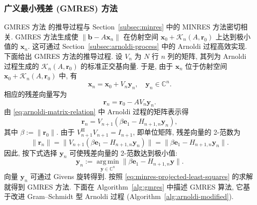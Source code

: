 \subsubsection{{广义最小残差 (GMRES) 方法}}\label{subsec:gmres-method}
{GMRES 方法  的推导过程与 Section\ \ref{subsec:minres} 中的 MINRES 方法密切相关. GMRES 方法生成使 $\|\bm b-A\bm x_n\|$ 在仿射空间 $\bm x_0+\mathcal K_n(A,\bm r_0)$ 上达到极小值的 $\bm x_n$. 这可通过 Section\ \ref{subsec:arnoldi-process} 中的 Arnoldi 过程高效实现. 下面给出 GMRES 方法的推导过程.}
{设 $V_n$ 为 $N$ 行 $n$ 列的矩阵, 其列为 Arnoldi 过程生成的 $\mathcal K_n(A,\bm r_0)$ 的标准正交基向量. 于是, 由于 $\bm x_n$ 位于仿射空间 $\bm x_0+\mathcal K_n(A,\bm r_0)$ 中, 有}
\[\bm x_n=\bm x_0+V_n\bm y_n,\quad\bm y_n\in\mathbb C^n.\]
{相应的残差向量写为}
\[\bm r_n=\bm r_0-AV_n\bm y_n.\]
{由 \eqref{eq:arnoldi-matrix-relation} 中 Arnoldi 过程的矩阵表示得}
\begin{equation}\label{eq:gmres-projected-residual}\bm r_n=V_{n+1}(\beta\bm e_1-H_{n+1,n}\bm y_n),\end{equation}
{其中 $\beta:=\|\bm r_0\|$. 由于 $V_{n+1}^{\mathrm H}V_{n+1}=I_{n+1}$, 即单位矩阵, 残差向量的 2-范数为}
\[\|\bm r_n\|=\|V_{n+1}(\beta\bm e_1-H_{n+1,n}\bm y_n)\|=\|\beta\bm e_1-H_{n+1,n}\bm y_n\|.\]
{因此, 按下式选择 $\bm y_n$ 可使残差向量的 2-范数达到极小值:}
\begin{equation}\label{eq:gmres-projected-minimization}\bm y_n:=\operatorname*{arg\,min}_{\bm y\in\mathbb C^n}\|\beta\bm e_1-H_{n+1,n}\bm y\|.\end{equation}
{向量 $\bm y_n$ 可通过 Givens 旋转得到. 按照 \eqref{eq:minres-projected-least-squares} 的求解就得到 GMRES 方法. 下面在 Algorithm\ \ref{alg:gmres} 中描述 GMRES 算法, 它基于改进 Gram--Schmidt 型 Arnoldi 过程 (Algorithm\ \ref{alg:arnoldi-modified}).}
